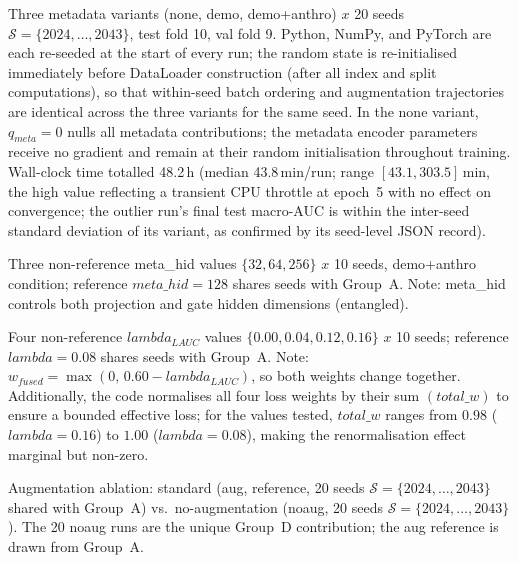 \documentclass[mathematics,article,submit,pdftex]{Definitions/mdpi}
\def\texttt#1{#1}%
\def\mathrm#1{#1}%
\def\textbf#1{#1}%
\def\times{x}%
\def\lambda{lambda }%
\begin{document}
{\sloppy
\begin{description}[leftmargin=1.5em, style=sameline, font=\normalfont]
\item[\textbf{Group A} (primary confirmatory, 60 runs).] Three metadata variants (\texttt{none}, \texttt{demo}, \texttt{demo+anthro}) $\times$ \textbf{20 seeds} $\mathcal{S}{=}\{2024,\ldots,2043\}$, test fold 10, val fold 9. Python, NumPy, and PyTorch are each re-seeded at the start of every run; the random state is re-initialised immediately before \texttt{DataLoader} construction (after all index and split computations), so that within-seed batch ordering and augmentation trajectories are identical across the three variants for the same seed. In the \texttt{none} variant, $q_{\mathrm{meta}}{=}0$ nulls all metadata contributions; the metadata encoder parameters receive no gradient and remain at their random initialisation throughout training. Wall-clock time totalled 48.2\,h (median 43.8\,min/run; range $[43.1, 303.5]$\,min, the high value reflecting a transient CPU throttle at epoch~5 with no effect on convergence; the outlier run's final test macro-AUC is within the inter-seed standard deviation of its variant, as confirmed by its seed-level JSON record).
\item[\textbf{Group B} (exploratory, 30 unique runs).] Three non-reference \texttt{meta\_hid} values $\{32,64,256\}$ $\times$ 10 seeds, \texttt{demo+anthro} condition; reference $\texttt{meta\_hid}{=}128$ shares seeds with Group~A. Note: \texttt{meta\_hid} controls both projection and gate hidden dimensions (entangled).
\item[\textbf{Group C} (exploratory, 40 unique runs).] Four non-reference $\lambda_{\mathrm{LAUC}}$ values $\{0.00,0.04,0.12,0.16\}$ $\times$ 10 seeds; reference $\lambda{=}0.08$ shares seeds with Group~A. Note: $w_{\mathrm{fused}}{=}\max(0,\,0.60{-}\lambda_{\mathrm{LAUC}})$, so both weights change together. Additionally, the code normalises all four loss weights by their sum $(\texttt{total\_w})$ to ensure a bounded effective loss; for the values tested, $\texttt{total\_w}$ ranges from $0.98$ ($\lambda{=}0.16$) to $1.00$ ($\lambda{=}0.08$), making the renormalisation effect marginal but non-zero.
\item[\textbf{Group D} (exploratory, 20 unique runs).] Augmentation ablation: standard (\texttt{aug}, reference, 20 seeds $\mathcal{S}{=}\{2024,\ldots,2043\}$ shared with Group~A) vs.\ no-augmentation (\texttt{noaug}, 20 seeds $\mathcal{S}{=}\{2024,\ldots,2043\}$). The 20 noaug runs are the unique Group~D contribution; the aug reference is drawn from Group~A.

\end{description}}
\end{document}
